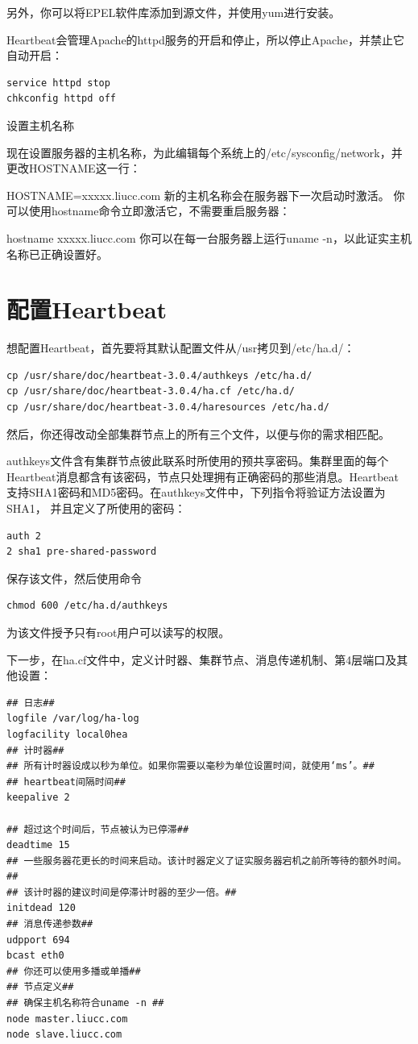 另外，你可以将EPEL软件库添加到源文件，并使用yum进行安装。

Heartbeat会管理Apache的httpd服务的开启和停止，所以停止Apache，并禁止它自动开启：

\begin{verbatim}
service httpd stop
chkconfig httpd off
\end{verbatim}

设置主机名称

现在设置服务器的主机名称，为此编辑每个系统上的/etc/sysconfig/network，并更改HOSTNAME这一行：

HOSTNAME=xxxxx.liucc.com 新的主机名称会在服务器下一次启动时激活。
你可以使用hostname命令立即激活它，不需要重启服务器：

hostname xxxxx.liucc.com 你可以在每一台服务器上运行uname -n，以此证实主机名称已正确设置好。

\section{配置Heartbeat}

想配置Heartbeat，首先要将其默认配置文件从/usr拷贝到/etc/ha.d/：

\begin{verbatim}
cp /usr/share/doc/heartbeat-3.0.4/authkeys /etc/ha.d/
cp /usr/share/doc/heartbeat-3.0.4/ha.cf /etc/ha.d/
cp /usr/share/doc/heartbeat-3.0.4/haresources /etc/ha.d/
\end{verbatim}

然后，你还得改动全部集群节点上的所有三个文件，以便与你的需求相匹配。

authkeys文件含有集群节点彼此联系时所使用的预共享密码。集群里面的每个
Heartbeat消息都含有该密码，节点只处理拥有正确密码的那些消息。Heartbeat
支持SHA1密码和MD5密码。在authkeys文件中，下列指令将验证方法设置为SHA1，
并且定义了所使用的密码：

\begin{verbatim}
auth 2
2 sha1 pre-shared-password
\end{verbatim}

保存该文件，然后使用命令

\begin{verbatim}
chmod 600 /etc/ha.d/authkeys
\end{verbatim}

为该文件授予只有root用户可以读写的权限。

下一步，在ha.cf文件中，定义计时器、集群节点、消息传递机制、第4层端口及其他设置：

\begin{verbatim}
## 日志##
logfile /var/log/ha-log
logfacility local0hea
## 计时器##
## 所有计时器设成以秒为单位。如果你需要以毫秒为单位设置时间，就使用‘ms’。##
## heartbeat间隔时间##
keepalive 2

## 超过这个时间后，节点被认为已停滞##
deadtime 15
## 一些服务器花更长的时间来启动。该计时器定义了证实服务器宕机之前所等待的额外时间。##
## 该计时器的建议时间是停滞计时器的至少一倍。##
initdead 120
## 消息传递参数##
udpport 694
bcast eth0
## 你还可以使用多播或单播##
## 节点定义##
## 确保主机名称符合uname -n ##
node master.liucc.com
node slave.liucc.com
\end{verbatim}


